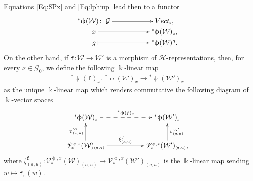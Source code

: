 \documentclass[11pt]{article}
\numberwithin{equation}{section}
\newcommand{\Vect}{{\rm Vect}_{\Sscript{\Bbbk}}}
\newcommand{\tF}{\texttt{f}}
\newcommand{\Go}{\cG_{\Sscript{0}}}
\newcommand{\vV}{\mathscr{V}}
\newcommand{\cG}{{\mathcal G}}
\newcommand{\cH}{{\mathcal H}}
\newcommand{\cW}{{\mathcal W}}
\newcommand{\Sscript}[1]{\scriptscriptstyle{#1}}
\newcommand{\pls}{{}^{*}\upphi}
\begin{document}
Equations \eqref{Eq:SPx} and \eqref{Eq:lphiup} lead then to a functor
\begin{gather}\label{Eq:starphiup}
\begin{gathered}
\xymatrix@R=0pt{ \pls(\cW) \colon \ \cG \ar@{->}^-{}[rr] & & \Vect, \\ x \ar@{|->}^-{}[rr] & & \pls(\cW)_{\Sscript{x}}, \\ g \ar@{|->}[rr] & & \pls(\cW)^g. }
\end{gathered}
\end{gather}
On the other hand, if $\tF\colon \cW \to \cW'$ is a morphism of $\cH$-representations, then, for every $x \in \Go$, we define the following $\Bbbk$-linear map
\begin{gather}\label{Eq:pf}
{}^*\upphi(\tF)_{\Sscript{x}}\colon \ {}^*\upphi(\cW)_{\Sscript{x}} \longrightarrow {}^*\upphi(\cW')_{\Sscript{x}}
\end{gather}
as the unique $\Bbbk$-linear map which renders commutative the following diagram of $\Bbbk$-vector spaces
\begin{gather*}
\xymatrix@R=25pt{ \pls(\cW)_{\Sscript{x}} \ar@{-->}^-{\pls(\tF)_{\Sscript{x}}}[rr] & & \pls(\cW')_{\Sscript{x}} \\ \vV^{\Sscript{\upphi, x}}_*(\cW)_{\Sscript{(a, u)}}
\ar@{->}^-{\upupsilon^{\Sscript{\cW}}_{\Sscript{(a, u)}}}[u] \ar@{->}^-{\xi^{\Sscript{\tF}}_{\Sscript{(a, u)}}}[rr] & & \ar@{->}_-{\upupsilon^{\Sscript{\cW'}}_{\Sscript{(a, u)}}}[u]
\vV^{\Sscript{\upphi, x}}_*(\cW')_{\Sscript{(a, u)}}, }
\end{gather*}
where $\xi^{\Sscript{\tF}}_{\Sscript{(a, u)}}\colon \vV^{\Sscript{\upphi, x}}_*(\cW)_{\Sscript{(a, u)}} \to \vV^{\Sscript{\upphi, x}}_*(\cW')_{\Sscript{(a, u)}} $ is the $\Bbbk$-linear map sending $w \mapsto \tF_{\Sscript{u}}(w)$.
\end{document}
